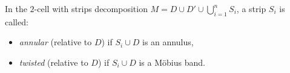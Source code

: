 In the $2$-cell with strips decomposition $M = D \cup D' \cup \bigcup_{i=1}^{n} S_i$, a strip $S_i$ is called:
\begin{itemize}
\item \emph{annular} (relative to $D$) if $S_i \cup D$ is an annulus,
\item \emph{twisted} (relative to $D$) if $S_i \cup D$ is a M\"obius band.
\end{itemize}
